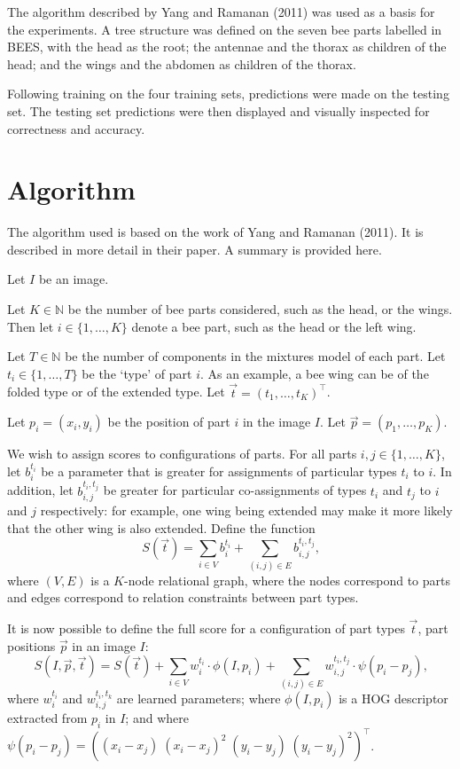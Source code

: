 \documentclass[11pt, oneside]{report}
\begin{document}
    The algorithm described by Yang and Ramanan (2011) was used as a basis for the experiments. A tree structure was defined on the seven bee parts labelled in BEES, with the head as the root; the antennae and the thorax as children of the head; and the wings and the abdomen as children of the thorax.

    Following training on the four training sets, predictions were made on the testing set. The testing set predictions were then displayed and visually inspected for correctness and accuracy.

\section{Algorithm}
    The algorithm used is based on the work of Yang and Ramanan (2011). It is described in more detail in their paper. A summary is provided here.

    Let $I$ be an image.

    Let $K \in\mathbb{N}$ be the number of bee parts considered, such as the head, or the wings. Then let $i \in \{1,\dots,K\}$ denote a bee part, such as the head or the left wing.

    Let $T\in\mathbb{N}$ be the number of components in the mixtures model of each part.  Let $t_i \in\{1,\dots,T\}$ be the `type' of part $i$. As an example, a bee wing can be of the folded type or of the extended type. Let $\vec{t}=(t_1,\dots,t_K)^\intercal$.

    Let $p_i=(x_i,y_i)$ be the position of part $i$ in the image $I$. Let $\vec p=(p_1,\dots,p_K)$.

    We wish to assign scores to configurations of parts. For all parts $i, j \in \{1,\dots,K\}$, let $b_i^{t_i}$ be a parameter that is greater for assignments of particular types $t_i$ to $i$. In addition, let $b_{i,j}^{t_i,t_j}$ be greater for particular co-assignments of types $t_i$ and $t_j$ to $i$ and $j$ respectively: for example, one wing being extended may make it more likely that the other wing is also extended. Define the function   \[
        S(\vec t) = \sum_{i\in V}b_i^{t_i}+\sum_{(i,j)\in E}b_{i,j}^{t_i,t_j}\textrm{,}
    \]
    where $(V,E)$ is a $K$-node relational graph, where the nodes correspond to parts and edges correspond to relation constraints between part types.

    It is now possible to define the full score for a configuration of part types $\vec t$, part positions $\vec p$ in an image $I$: \[
        S(I,\vec p, \vec t) = S(\vec t) + \sum_{i\in V}w^{t_i}_i\cdot\phi(I,p_i)
        + \sum_{(i,j) \in E}w_{i,j}^{t_i,t_j}\cdot\psi(p_i-p_j)\textrm{,}
    \]
    where $w_i^{t_i}$ and $w_{i,j}^{t_i,t_k}$ are learned parameters; where $\phi(I, p_i)$ is a HOG descriptor extracted from $p_i$ in $I$; and where $\psi(p_i-p_j)=\left((x_i-x_j)\;(x_i-x_j)^2\;(y_i-y_j)\;(y_i-y_j)^2\right)^\intercal$.
\end{document}
